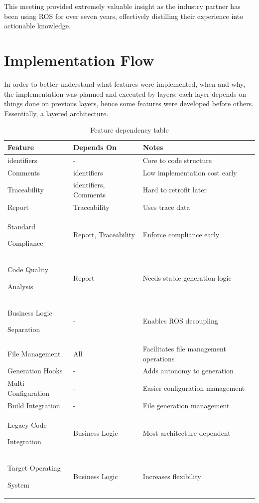 \begin{tcolorbox}[colback=green!5, colframe=green!40!black] 
	This meeting provided extremely valuable insight as the industry partner has been using \gls{ROS} for over seven years, effectively distilling their experience into actionable knowledge. 
\end{tcolorbox}


\section{Implementation Flow} 
\label{sec:impl_plan}

In order to better understand what features were implemented, when and why, the implementation was planned and executed by layers: each layer depends on things done on previous layers, hence some features were developed before others. Essentially, a layered architecture.

\bgroup
{}
\begin{xltabular}{\textwidth}{X X X}
	\caption{Feature dependency table}
	\label{tab:impl_plan}\\
	\toprule
	Feature & Depends On & Notes \\
	\midrule
	\Glspl{identifier} & - & Core to code structure \\
	Comments & \Glspl{identifier} & Low implementation cost early \\
	Traceability & \Glspl{identifier}, Comments & Hard to retrofit later \\
	Report & Traceability & Uses trace data \\
	Standard\par Compliance & Report, Traceability & Enforce compliance early \\
	Code Quality\par Analysis & Report & Needs stable generation logic \\
	Business Logic\par Separation & - & Enables \gls{ROS} decoupling \\
	File Management & All & Facilitates file management operations \\
	Generation Hooks & - & Adds autonomy to generation \\
	Multi Configuration & - & Easier configuration management \\
	Build Integration & - & File generation management \\
	Legacy Code\par Integration & Business Logic & Most architecture-dependent \\
	Target Operating\par System & Business Logic & Increases flexibility \\
	\bottomrule
\end{xltabular}


